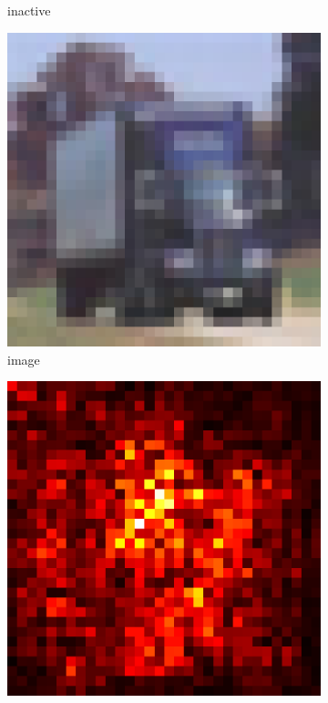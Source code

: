 \documentclass[preprint,12pt]{elsarticle}
\begin{document}
\begin{figure}
\begin{subfigure}{0.14\textwidth}
        \caption{inactive}
    \end{subfigure}
    \hfill
    \begin{subfigure}{0.14\linewidth}
        \centering
        \includegraphics[width=\linewidth]{../visualizations/examples/cifar10/resnet18/images/9.png}
        \caption{image}
    \end{subfigure}
    \hfill
    \begin{subfigure}{0.14\linewidth}
        \centering
        \includegraphics[width=\linewidth]{../visualizations/examples/cifar10/resnet18/saliency_map/9.png}

\end{subfigure}
\end{figure}
\end{document}
